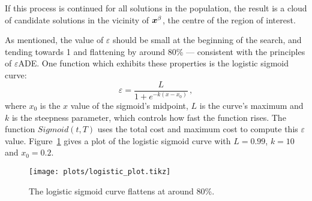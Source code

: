 If this process is continued for all solutions in the population, the result is a cloud of candidate solutions in the vicinity of $\boldsymbol{x}^\beta$, the centre of the region of interest.
 
As mentioned, the value of $\varepsilon$ should be small at the beginning of the search, and tending towards 1 and flattening by around 80\% --- consistent with the principles of $\varepsilon$ADE. One function which exhibits these properties is the logistic sigmoid curve:
\begin{equation}\label{eq:logistic}
\varepsilon = \dfrac{L}{1+e^{-k(x-x_0)}}\,,
\end{equation}
where $x_0$ is the $x$ value of the sigmoid's midpoint, $L$ is the curve's maximum and $k$ is the steepness parameter, which controls how fast the function rises. The function $Sigmoid(t,T)$ uses the total cost and maximum cost to compute this $\varepsilon$ value. Figure~\ref{fig:logistic} gives a plot of the logistic sigmoid curve with $L=0.99$, $k=10$ and $x_0 = 0.2$. 
\begin{figure}[h!]
  \centering
  \texttt{[image: plots/logistic\_plot.tikz]}  
  \caption{The logistic sigmoid curve flattens at around 80\%.} 
    \label{fig:logistic}
\end{figure}
